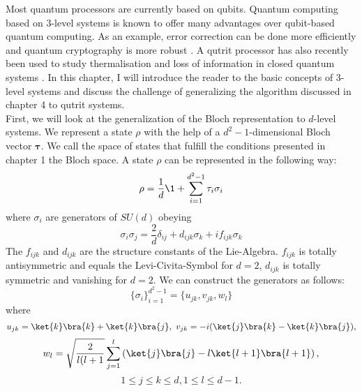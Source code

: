 Most quantum processors are currently based on qubits.
Quantum computing based on $3$-level systems is known to offer many advantages over qubit-based quantum computing.
As an example, error correction can be done more efficiently \cite{campbell14} and quantum cryptography is more robust \cite{bechmann00}.
A qutrit processor has also recently been used to study thermalisation and loss of information in closed quantum systems \cite{blok20}.
In this chapter, I will introduce the reader to the basic concepts of $3$-level systems and discuss the challenge of generalizing the algorithm discussed in chapter 4 to qutrit systems.\\
First, we will look at the generalization of the Bloch representation to $d$-level systems.
We represent a state $\rho$ with the help of a $d^2-1$-dimensional Bloch vector $\bm{\tau}$.
We call the space of states that fulfill the conditions presented in chapter 1 the Bloch space.
A state $\rho$ can be represented in the following way:
$$\rho = \frac{1}{d} \1 + \sum_{i=1}^{d^2-1} \tau_i \sigma_i$$
where $\sigma_i$ are generators of $SU(d)$ obeying
\begin{equation}\label{sig}
	\sigma_i\sigma_j = \frac{2}{d}\delta_{ij} + d_{ijk}\sigma_k + if_{ijk}\sigma_k
\end{equation}
The $f_{ijk}$ and $d_{ijk}$ are the structure constants of the Lie-Algebra.
$f_{ijk}$ is totally antisymmetric and equals the Levi-Civita-Symbol for $d=2$, $d_{ijk}$ is totally symmetric and vanishing for $d=2$.
We can construct the generators as follows:\cite{kimura03}
 \[
\{\sigma_i\}^{d^2-1}_{i=1} = \{u_{jk},v_{jk},w_l\}
\]
where
$$
	u_{jk} = \ket{k}\bra{k}+\ket{k}\bra{j}, ~ v_{jk} = -i(\ket{j}\bra{k}-\ket{k}\bra{j}),
$$
$$
	w_l = \sqrt{\frac{2}{l(l+1}} \sum_{j=1}^{l} \left( \ket{j}\bra{j}-l\ket{l+1}\bra{l+1} \right),$$
	$$ 1\le j\le k\le d, 1\le l\le d-1.$$

